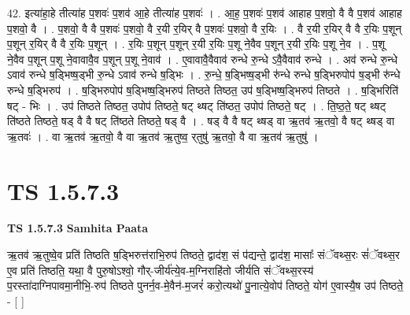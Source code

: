 \documentclass[17pt]{extarticle}
\begin{document}
42. इत्या॑हा॒हे तीत्या॑ह प॒शवः॑ प॒शव॑ आ॒हे तीत्या॑ह प॒शवः॑ । . आ॒ह॒ प॒शवः॑ प॒शव॑ आहाह प॒शवो॒ वै वै प॒शव॑ आहाह प॒शवो॒ वै । . प॒शवो॒ वै वै प॒शवः॑ प॒शवो॒ वै र॒यी र॒यिर् वै प॒शवः॑ प॒शवो॒ वै र॒यिः । . वै र॒यी र॒यिर् वै वै र॒यिः प॒शून् प॒शून् र॒यिर् वै वै र॒यिः प॒शून् । . र॒यिः प॒शून् प॒शून् र॒यी र॒यिः प॒शू ने॒वैव प॒शून् र॒यी र॒यिः प॒शू ने॒व । . प॒शू ने॒वैव प॒शून् प॒शू ने॒वावावै॒व प॒शून् प॒शू ने॒वाव॑ । . ए॒वावावै॒वैवाव॑ रुन्धे रु॒न्धे ऽवै॒वैवाव॑ रुन्धे । . अव॑ रुन्धे रु॒न्धे ऽवाव॑ रुन्धे ष॒ड्भिष्ष॒ड्भी रु॒न्धे ऽवाव॑ रुन्धे ष॒ड्भिः । . रु॒न्धे॒ ष॒ड्भिष्ष॒ड्भी रु॑न्धे रुन्धे ष॒ड्भिरुपोप॑ ष॒ड्भी रु॑न्धे रुन्धे ष॒ड्भिरुप॑ । . ष॒ड्भिरुपोप॑ ष॒ड्भिष्ष॒ड्भिरुप॑ तिष्ठते तिष्ठत॒ उप॑ ष॒ड्भिष्ष॒ड्भिरुप॑ तिष्ठते । . ष॒ड्भिरिति॑ षट् - भिः । . उप॑ तिष्ठते तिष्ठत॒ उपोप॑ तिष्ठते॒ षट् थ्षट् ति॑ष्ठत॒ उपोप॑ तिष्ठते॒ षट् । . ति॒ष्ठ॒ते॒ षट् थ्षट् ति॑ष्ठते तिष्ठते॒ षड् वै वै षट् ति॑ष्ठते तिष्ठते॒ षड् वै । . षड् वै वै षट् थ्षड् वा ऋ॒तव॑ ऋ॒तवो॒ वै षट् थ्षड् वा ऋ॒तवः॑ । . वा ऋ॒तव॑ ऋ॒तवो॒ वै वा ऋ॒तव॑ ऋ॒तुष्व॒ र्‌तुषु॑ ऋ॒तवो॒ वै वा ऋ॒तव॑ ऋ॒तुषु॑ । \newline
\pagebreak
{}

\section{ TS 1.5.7.3 }

\textbf{TS 1.5.7.3 } \newline
\textbf{Samhita Paata} \newline

ऋ॒तव॑ ऋ॒तुष्वे॒व प्रति॑ तिष्ठति ष॒ड्भिरुत्त॑राभि॒रुप॑ तिष्ठते॒ द्वाद॑श॒ सं प॑द्यन्ते॒ द्वाद॑श॒ मासाः᳚ संॅवथ्स॒रः सं॑ॅवथ्स॒र ए॒व प्रति॑ तिष्ठति॒ यथा॒ वै पुरु॒षोऽश्वो॒ गौर्-जीर्य॑त्ये॒व-म॒ग्निराहि॑तो जीर्यति संॅवथ्स॒रस्य॑ प॒रस्ता॑दाग्निपावमा॒नीभि॒-रुप॑ तिष्ठते पुनर्न॒व-मे॒वैन॑-म॒जरं॑ करो॒त्यथो॑ पु॒नात्ये॒वोप॑ तिष्ठते॒ योग॑ ए॒वास्यै॒ष उप॑ तिष्ठते॒ - [ ] \newline
\end{document}
